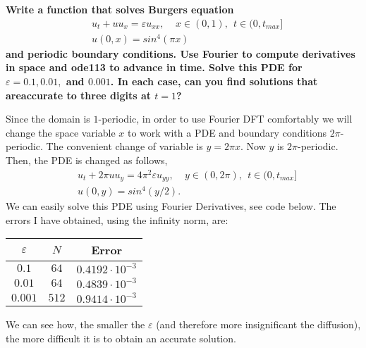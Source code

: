 \textbf{Write a function that solves Burgers equation
\begin{align*}
&u_t+uu_x=\varepsilon u_{xx},~~~~~x\in(0,1),~~t\in(0,t_{max}]\\
&u(0,x)=sin^4(\pi x)
\end{align*}
and periodic boundary conditions. Use Fourier to compute derivatives in space and ode113 to advance in time. Solve this PDE for $\varepsilon= 0.1,0.01,$ and $0.001$. In each case, can you find solutions that areaccurate to three digits at $t= 1$?}
\newline

Since the domain is $1$-periodic, in order to use Fourier DFT comfortably we will change the space variable $x$ to work with a PDE and boundary conditions $2\pi$-periodic. The convenient change of variable is $y = 2\pi x$. Now $y$ is $2\pi$-periodic. Then, the PDE is changed as follows,
\begin{align*}
&u_t+2\pi uu_y=4\pi^2\varepsilon u_{yy},~~~~~y\in(0,2\pi),~~t\in(0,t_{max}]\\
&u(0,y)=sin^4(y/2).
\end{align*}
We can easily solve this PDE using Fourier Derivatives, see code below. The errors I have obtained, using the infinity norm, are:
\begin{center}
 \begin{tabular}{||c c c||} 
 \hline
 $\varepsilon$ & $N$ & Error \\ [0.5ex] 
 \hline\hline
 $0.1$  & $64$ & $0.4192\cdot 10^{-3}$ \\ 
 \hline
 $0.01$  & $64$ & $0.4839\cdot 10^{-3}$ \\
 \hline
 $0.001$ & $512$ & $0.9414\cdot 10^{-3}$ \\
 \hline
\end{tabular}
\end{center}
We can see how, the smaller the $\varepsilon$ (and therefore more insignificant the diffusion), the more difficult it is to obtain an accurate solution.

